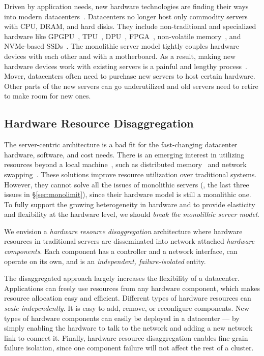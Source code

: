Driven by application needs, new hardware technologies are finding their ways into modern datacenters~\cite{sigarch-dc}.
Datacenters no longer host only commodity servers with CPU, DRAM, and hard disks. 
They include non-traditional and specialized hardware like GPGPU~\cite{GPU-google,GPU-aws}, 
TPU~\cite{TPU}, 
DPU~\cite{DPU},
FPGA~\cite{Putnam14-FPGA,Amazon-F1}, %
non-volatile memory~\cite{Intel3DXpoint}, %
and NVMe-based SSDs~\cite{everspin}.
The monolithic server model tightly couples hardware devices with each other and with a motherboard.
As a result, making new hardware devices work with existing servers is a painful and lengthy process~\cite{Putnam14-FPGA}.
Mover, datacenters often need to purchase new servers to host certain hardware.
Other parts of the new servers can go underutilized 
and old servers need to retire to make room for new ones.

\subsection{Hardware Resource Disaggregation}
The server-centric architecture is a bad fit for the fast-changing datacenter hardware, software, and cost needs.
There is an emerging interest in utilizing resources beyond a local machine~\cite{Gao16-OSDI},
such as distributed memory~\cite{Dragojevic14-FaRM,Nelson15-ATC,Aguilera17-SOCC,Novakovic16-SOCC} and network swapping~\cite{GU17-NSDI}. 
These solutions improve resource utilization over traditional systems.
However, they cannot solve all the issues of monolithic servers (\eg, the last three issues in \S\ref{sec:monolimit}), 
since their hardware model is still a monolithic one.
To fully support the growing heterogeneity in hardware and to provide elasticity and flexibility at the hardware level, 
we should {\em break the monolithic server model.}%

We envision a {\em hardware resource disaggregation} architecture 
where hardware resources in traditional servers are disseminated into network-attached {\em hardware components}.
Each component has a controller and a network interface,
can operate on its own,
and is an {\em independent, failure-isolated} entity.

The disaggregated approach largely increases the flexibility of a datacenter.
Applications can freely use resources from any hardware component,
which makes resource allocation easy and efficient.
Different types of hardware resources can {\em scale independently}.
It is easy to add, remove, or reconfigure components.
New types of hardware components can easily be deployed in a datacenter ---
by simply enabling the hardware to talk to the network and adding a new network link to connect it.
Finally, hardware resource disaggregation enables fine-grain failure isolation, %
since one component failure will not affect the rest of a cluster.

